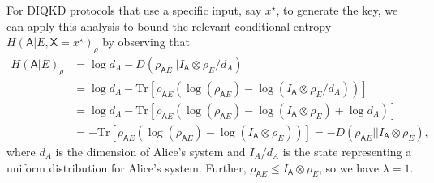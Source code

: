 \documentclass[10pt, a4paper]{article}
\numberwithin{equation}{section} %
\theoremstyle{definition}
\theoremstyle{plain}
\newcommand{\?}{\mathrel{?}} %
\newcommand{\Tr}{\mathrm{Tr}} %
\newcommand{\crv}[1]{\mathsf{#1}}
\begin{document}
      For DIQKD protocols that use a specific input, say \(x^{\star}\), to generate the key, we can apply this analysis to bound the relevant conditional entropy \(H{(\crv{A}|E, \crv{X}=x^{\star})}_{\rho}\) by observing that
      \begin{align*}
        H{(\crv{A}|E)}_{\rho} &= \log d_A - D(\rho_{\crv{A}E}||I_{\crv{A}}\otimes\rho_{E} / d_A) \\
                              &= \log d_A - \Tr\left[\rho_{\crv{A}E}(\log(\rho_{\crv{A}E}) - \log(I_{\crv{A}}\otimes\rho_{E} / d_A))\right] \\
                              &= \log d_A - \Tr\left[\rho_{\crv{A}E}(\log(\rho_{\crv{A}E}) - \log(I_{\crv{A}}\otimes\rho_{E}) + \log d_A)\right] \\
                              &= -\Tr\left[\rho_{\crv{A}E}(\log(\rho_{\crv{A}E}) - \log(I_{\crv{A}}\otimes\rho_{E}))\right] = -D(\rho_{\crv{A}E}||I_{\crv{A}}\otimes\rho_{E}),
      \end{align*}
      where \(d_A\) is the dimension of Alice's system and \(I_A/d_A\) is the state representing a uniform distribution for Alice's system. Further, \(\rho_{\crv{A}E} \leq I_{\crv{A}} \otimes \rho_{E}\), so we have \(\lambda = 1\).
\end{document}
